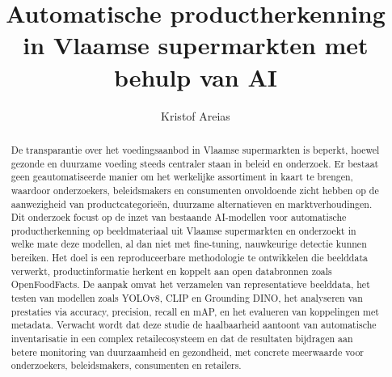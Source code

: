 \documentclass{hogent-article}
\title{Automatische productherkenning in Vlaamse supermarkten met behulp van AI}
\author{Kristof Areias}
\begin{document}
\begin{abstract}
  De transparantie over het voedingsaanbod in Vlaamse supermarkten is beperkt, hoewel gezonde en duurzame voeding steeds centraler staan in beleid en onderzoek. 
  Er bestaat geen geautomatiseerde manier om het werkelijke assortiment in kaart te brengen, waardoor onderzoekers, beleidsmakers en consumenten onvoldoende zicht hebben op de aanwezigheid van productcategorieën, duurzame alternatieven en marktverhoudingen. 
  Dit onderzoek focust op de inzet van bestaande AI-modellen voor automatische productherkenning op beeldmateriaal uit Vlaamse supermarkten en onderzoekt in welke mate deze modellen, al dan niet met fine-tuning, nauwkeurige detectie kunnen bereiken. 
  Het doel is een reproduceerbare methodologie te ontwikkelen die beelddata verwerkt, productinformatie herkent en koppelt aan open databronnen zoals OpenFoodFacts. 
  De aanpak omvat het verzamelen van representatieve beelddata, het testen van modellen zoals YOLOv8, CLIP en Grounding DINO, het analyseren van prestaties via accuracy, precision, recall en mAP, en het evalueren van koppelingen met metadata. 
  Verwacht wordt dat deze studie de haalbaarheid aantoont van automatische inventarisatie in een complex retailecosysteem en dat de resultaten bijdragen aan betere monitoring van duurzaamheid en gezondheid, met concrete meerwaarde voor onderzoekers, beleidsmakers, consumenten en retailers.
\end{abstract}

\tableofcontents



\printbibliography[heading=bibintoc]
\end{document}
